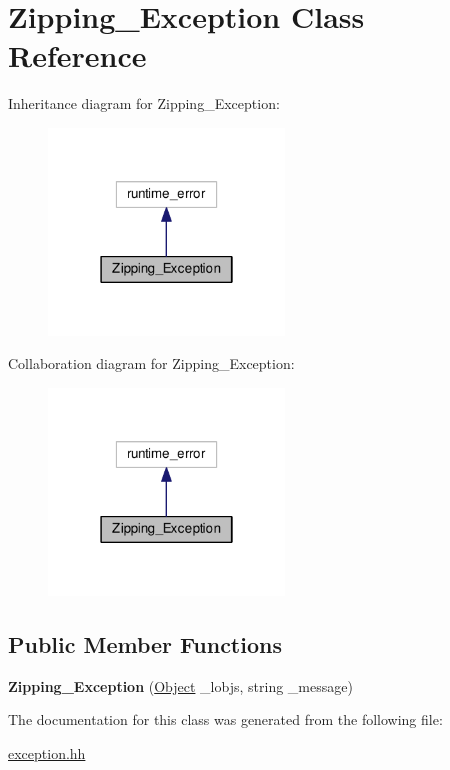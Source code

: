\hypertarget{classZipping__Exception}{\section{Zipping\-\_\-\-Exception Class Reference}
\label{classZipping__Exception}
}


Inheritance diagram for Zipping\-\_\-\-Exception\-:\nopagebreak
\begin{figure}[H]
\begin{center}
\leavevmode
\includegraphics[width=178pt]{classZipping__Exception__inherit__graph}
\end{center}
\end{figure}


Collaboration diagram for Zipping\-\_\-\-Exception\-:\nopagebreak
\begin{figure}[H]
\begin{center}
\leavevmode
\includegraphics[width=178pt]{classZipping__Exception__coll__graph}
\end{center}
\end{figure}
\subsection*{Public Member Functions}
\begin{DoxyCompactItemize}
\item 
\hypertarget{classZipping__Exception_a7ea62c850ba54f7644f156dcb7c21826}{{\bfseries Zipping\-\_\-\-Exception} (\hyperlink{classCell}{Object} \-\_\-lobjs, string \-\_\-message)}\label{classZipping__Exception_a7ea62c850ba54f7644f156dcb7c21826}

\end{DoxyCompactItemize}


The documentation for this class was generated from the following file\-:\begin{DoxyCompactItemize}
\item 
\hyperlink{exception_8hh}{exception.\-hh}\end{DoxyCompactItemize}
